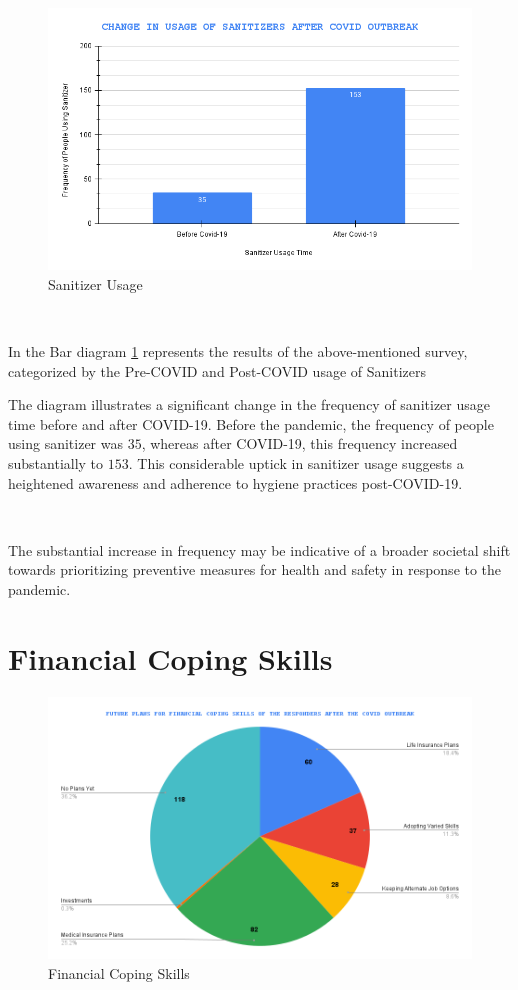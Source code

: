 \begin{figure}[h!]
	\centering
	\includegraphics[width=0.8\linewidth]{IMAGES/Image 36.png}
	\caption{Sanitizer Usage}
	\label{G36}
\end{figure}

\ 

In the Bar diagram \ref{G36} represents the results of the above-mentioned survey, categorized by the Pre-COVID and Post-COVID usage of Sanitizers  

The diagram illustrates a significant change in the frequency of sanitizer usage time before and after COVID-19. Before the pandemic, the frequency of people using sanitizer was $35$, whereas after COVID-19, this frequency increased substantially to $153$. This considerable uptick in sanitizer usage suggests a heightened awareness and adherence to hygiene practices post-COVID-19. 

\

The substantial increase in frequency may be indicative of a broader societal shift towards prioritizing preventive measures for health and safety in response to the pandemic.

\section{Financial Coping Skills}

\begin{figure}[h!]
	\centering
	\includegraphics[width=0.9\linewidth]{IMAGES/Image 37.png}
	\caption{Financial Coping Skills}
	\label{G37}
\end{figure}

